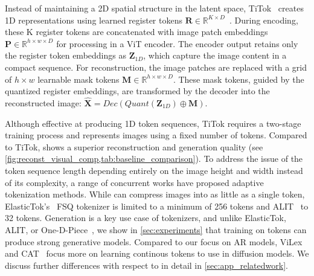 Instead of maintaining a 2D spatial structure in the latent space, TiTok~\cite{yu2024titok} creates 1D representations using learned register tokens $\bm{R} \in \mathbb{R}^{K \times D}$~\cite{Darcet2023Registers}. During encoding, these K register tokens are concatenated with image patch embeddings $\bm{P} \in \mathbb{R}^{h \times w \times D}$ for processing in a ViT encoder. The encoder output retains only the register token embeddings as $\bm{Z}_{1D}$, which capture the image content in a compact sequence. For reconstruction, the image patches are replaced with a grid of $h \times w$ learnable mask tokens $\bm{M} \in \mathbb{R}^{h \times w \times D}$. These mask tokens, guided by the quantized register embeddings, are transformed by the decoder into the reconstructed image: $\bm{\hat{X}} = Dec(Quant(\bm{Z}_{1D}) \oplus \bm{M})$.

Although effective at producing 1D token sequences, TiTok requires a two-stage training process and represents images using a fixed number of tokens. Compared to TiTok, \ours shows a superior reconstruction and generation quality (see \cref{fig:reconst_visual_comp,tab:baseline_comparison}). To address the issue of the token sequence length depending entirely on the image height and width instead of its complexity, a range of concurrent works have proposed adaptive tokenization methods. While \ours can compress images into as little as a single token, ElasticTok's~\cite{Yan2024ElasticTok} FSQ tokenizer is limited to a minimum of 256 tokens and ALIT~\cite{Duggal2024ALIT} to 32 tokens. Generation is a key use case of tokenizers, and unlike ElasticTok, ALIT, or One-D-Piece~\cite{miwa2025onedpiece}, we show in \cref{sec:experiments} that training on \ours tokens can produce strong generative models. Compared to our focus on AR models, ViLex~\cite{Wang2024ViLex} and CAT~\cite{Shen2025CATCI} focus more on learning continous tokens to use in diffusion models. We discuss further differences with respect to \ours in detail in \cref{sec:app_relatedwork}.
